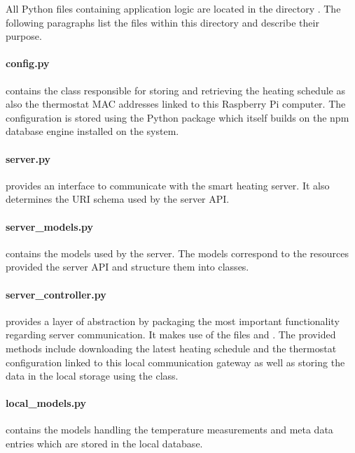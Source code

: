 All Python files containing application logic are located in the directory .
The following paragraphs list the files within this directory and describe their purpose.


\paragraph{config.py} contains the  class responsible for storing and retrieving the heating schedule as also the thermostat MAC addresses linked to this Raspberry Pi computer.
The configuration is stored using the  Python package which itself builds on the npm database engine installed on the system.

\paragraph{server.py} provides an interface to communicate with the smart heating server.
It also determines the URI schema used by the server API.

\paragraph{server\_models.py} contains the models used by the server.
The models correspond to the resources provided the server API and structure them into classes.

\paragraph{server\_controller.py} provides a layer of abstraction by packaging the most important functionality regarding server communication.
It makes use of the files  and .
The provided methods include downloading the latest heating schedule and the thermostat configuration linked to this local communication gateway as well as storing the data in the local storage using the  class.

\paragraph{local\_models.py} contains the models handling the temperature measurements and meta data entries which are stored in the local database.

